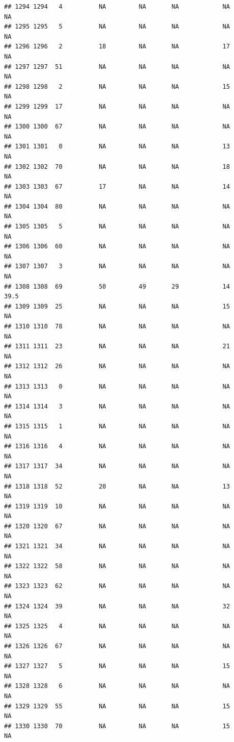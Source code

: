\documentclass[man]{apa6}
\begin{document}
\begin{verbatim}
## 1294 1294   4          NA         NA       NA            NA       NA
## 1295 1295   5          NA         NA       NA            NA       NA
## 1296 1296   2          18         NA       NA            17       NA
## 1297 1297  51          NA         NA       NA            NA       NA
## 1298 1298   2          NA         NA       NA            15       NA
## 1299 1299  17          NA         NA       NA            NA       NA
## 1300 1300  67          NA         NA       NA            NA       NA
## 1301 1301   0          NA         NA       NA            13       NA
## 1302 1302  70          NA         NA       NA            18       NA
## 1303 1303  67          17         NA       NA            14       NA
## 1304 1304  80          NA         NA       NA            NA       NA
## 1305 1305   5          NA         NA       NA            NA       NA
## 1306 1306  60          NA         NA       NA            NA       NA
## 1307 1307   3          NA         NA       NA            NA       NA
## 1308 1308  69          50         49       29            14     39.5
## 1309 1309  25          NA         NA       NA            15       NA
## 1310 1310  78          NA         NA       NA            NA       NA
## 1311 1311  23          NA         NA       NA            21       NA
## 1312 1312  26          NA         NA       NA            NA       NA
## 1313 1313   0          NA         NA       NA            NA       NA
## 1314 1314   3          NA         NA       NA            NA       NA
## 1315 1315   1          NA         NA       NA            NA       NA
## 1316 1316   4          NA         NA       NA            NA       NA
## 1317 1317  34          NA         NA       NA            NA       NA
## 1318 1318  52          20         NA       NA            13       NA
## 1319 1319  10          NA         NA       NA            NA       NA
## 1320 1320  67          NA         NA       NA            NA       NA
## 1321 1321  34          NA         NA       NA            NA       NA
## 1322 1322  58          NA         NA       NA            NA       NA
## 1323 1323  62          NA         NA       NA            NA       NA
## 1324 1324  39          NA         NA       NA            32       NA
## 1325 1325   4          NA         NA       NA            NA       NA
## 1326 1326  67          NA         NA       NA            NA       NA
## 1327 1327   5          NA         NA       NA            15       NA
## 1328 1328   6          NA         NA       NA            NA       NA
## 1329 1329  55          NA         NA       NA            15       NA
## 1330 1330  70          NA         NA       NA            15       NA

\end{verbatim}
\end{document}
